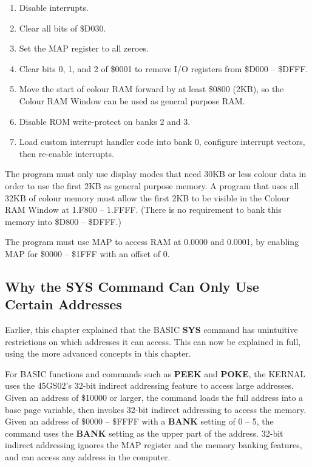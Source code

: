 \begin{enumerate}
\item Disable interrupts.
\item Clear all bits of \$D030.
\item Set the MAP register to all zeroes.
\item Clear bits 0, 1, and 2 of \$0001 to remove I/O registers from \$D000 -- \$DFFF.
\item Move the start of colour RAM forward by at least \$0800 (2KB), so the Colour RAM Window can be used as general purpose RAM.
\item Disable ROM write-protect on banks 2 and 3.
\item Load custom interrupt handler code into bank 0, configure interrupt vectors, then re-enable interrupts.
\end{enumerate}

The program must only use display modes that need 30KB or less colour data in order to use the first 2KB as general purpose memory. A program that uses all 32KB of colour memory must allow the first 2KB to be visible in the Colour RAM Window at 1.F800 -- 1.FFFF. (There is no requirement to bank this memory into \$D800 -- \$DFFF.)

The program must use MAP to access RAM at 0.0000 and 0.0001, by enabling MAP for \$0000 -- \$1FFF with an offset of 0.

\subsection{Why the SYS Command Can Only Use Certain Addresses}

Earlier, this chapter explained that the BASIC {\bf SYS} command has unintuitive restrictions on which addresses it can access. This can now be explained in full, using the more advanced concepts in this chapter.

For BASIC functions and commands such as {\bf PEEK} and {\bf POKE}, the KERNAL uses the 45GS02's 32-bit indirect addressing feature to access large addresses. Given an address of \$10000 or larger, the command loads the full address into a base page variable, then invokes 32-bit indirect addressing to access the memory. Given an address of \$0000 -- \$FFFF with a {\bf BANK} setting of 0 -- 5, the command uses the {\bf BANK} setting as the upper part of the address. 32-bit indirect addressing ignores the MAP register and the memory banking features, and can access any address in the computer.

